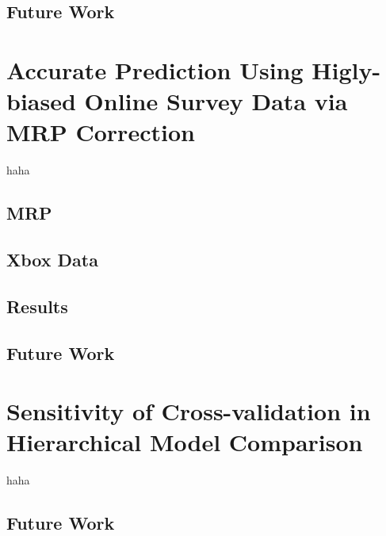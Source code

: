 \documentclass[xetex,mathserif,serif]{beamer}
\begin{document}
\subsection{Future Work}

\section{Accurate Prediction Using Higly-biased Online Survey Data via MRP
  Correction}
\begin{frame}
  haha
\end{frame}
\subsection{MRP}
\subsection{Xbox Data}
\subsection{Results}
\subsection{Future Work}

\section{Sensitivity of Cross-validation in Hierarchical Model Comparison}
\begin{frame}
  haha
\end{frame}
\subsection{Future Work}
\end{document}
